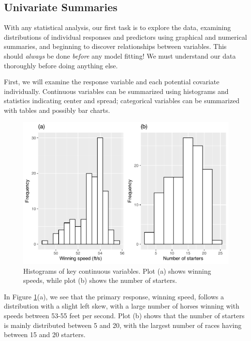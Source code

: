 \documentclass[
]{krantz}
\begin{document}
\subsection{Univariate Summaries}\label{univariate-summaries}

With any statistical analysis, our first task is to explore the data, examining distributions of individual responses and predictors using graphical and numerical summaries, and beginning to discover relationships between variables. This should \emph{always} be done \emph{before} any model fitting! We must understand our data thoroughly before doing anything else.

First, we will examine the response variable and each potential covariate individually. Continuous variables can be summarized using histograms and statistics indicating center and spread; categorical variables can be summarized with tables and possibly bar charts.

\begin{figure}

{\centering \includegraphics[width=0.9\linewidth]{bookdown-BeyondMLR_files/figure-latex/twohist-1} 

}

\caption{Histograms of key continuous variables.  Plot (a) shows winning speeds, while plot (b) shows the number of starters.}\label{fig:twohist}
\end{figure}

In Figure \ref{fig:twohist}(a), we see that the primary response, winning speed, follows a distribution with a slight left skew, with a large number of horses winning with speeds between 53-55 feet per second. Plot (b) shows that the number of starters is mainly distributed between 5 and 20, with the largest number of races having between 15 and 20 starters.
\end{document}

